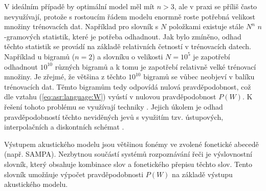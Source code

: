 \noindent V ideálním případě by optimální model měl mít $n > 3$, ale v praxi se příliš často nevyužívají, protože s rostoucím řádem modelu enormně roste potřebná velikost množiny trénovacích dat. Například pro slovník s $N$ položkami existuje stále $N^{n}$ $n$-gramových statistik, které je potřeba odhadnout. Jak bylo zmíněno, odhad těchto statistik se provádí na základě relativních četností v trénovacích datech. Například u bigramů ($n=2$) a slovníku o velikosti $N=10^{5}$ je zapotřebí odhadnout $10^{10}$ různých bigramů a k tomu je zapotřebí relativně velké trénovací množiny. Je zřejmé, že většina z těchto $10^{10}$ bigramů se vůbec neobjeví v balíku trénovacích dat. Těmto  bigramům tedy odpovídá nulová pravděpodobnost, což dle vztahu (\ref{eq:asr:language:W}) vyústí v nulovou pravděpodobnost $P\left(W\right)$. K řešení tohoto problému se využívají techniky . Jejich úkolem je odhad pravděpodobností těchto neviděných jevů s využitím tzv. ústupových, interpolačních a diskontních schémat \cite{Psutka2006}.

Výstupem akustického modelu jsou většinou fonémy ve zvolené fonetické abecedě (např. SAMPA). Nezbytnou součástí systémů rozpoznávání řeči je výslovnostní slovník, který obsahuje kombinace slov a fonetického přepisu těchto slov.
Tento slovník umožňuje výpočet pravděpodobnosti $P\left(W\right)$ na základě výstupu akustického modelu.

